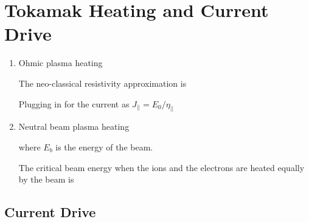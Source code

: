 \section{Tokamak Heating and Current Drive}
\begin{enumerate}
\item{Ohmic plasma heating

The neo-classical resistivity approximation is 


\noindent Plugging in for the current as $J_{||}=E_{0}/\eta_{||}$ 

}

\item{Neutral beam plasma heating 



\indent where $E_{b}$ is the energy of the beam.

\noindent The critical beam energy when the ions and the electrons are heated equally by the beam is

}
\end{enumerate}
\subsection{Current Drive}

